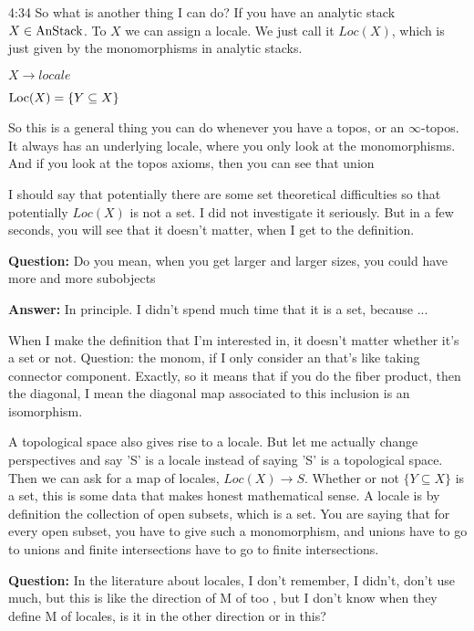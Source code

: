 \begin{unfinished}{4:34}
So what is another thing I can do? If you have an analytic stack $X \in \text{AnStack}$.
To $X$ we can assign a locale. We just call it $Loc(X)$, which is just given by the monomorphisms in analytic stacks.

$ X \rightarrow locale$

$ \text{Loc}(X) = \{ Y \subseteq X \} $

So this is a general thing you can do whenever you have a topos, or an $\infty$-topos.
It always has an underlying locale, where you only look at the monomorphisms. And if you look at the topos axioms, then you can see that union 

I should say that potentially there are some set theoretical difficulties so that potentially $Loc(X)$ is not a set. I did not investigate it seriously. But in a few seconds, you will see that it doesn't matter, when I get to the definition.

\textbf{Question:} Do you mean, when you get larger and larger sizes, you could have more and more subobjects

\textbf{Answer:} In principle. I didn't spend much time that it is a set, because ...


When I make the definition that I'm interested in, it doesn't matter whether it's a set or not. Question: the monom, if I only consider an that's like taking connector component. Exactly, so it means that if you do the fiber product, then the diagonal, I mean the diagonal map associated to this inclusion is an isomorphism.

A topological space also gives rise to a locale. But let me actually change perspectives and say 'S' is a locale instead of saying 'S' is a topological space. 
Then we can ask for a map of locales, $Loc(X) \rightarrow S$. Whether or not $\{ Y \subseteq X \} $ is a set, this is some data that makes honest mathematical sense. A locale is by definition the collection of open subsets, which is a set. You are saying that for every open subset, you have to give such a monomorphism, and  unions have to go to unions and finite intersections have to go to finite intersections.

\textbf{Question:} In the literature about locales, I don't remember, I didn't, don't use much, but this is like the direction of M of too \citeme{}, but I don't know when they define M of locales, is it in the other direction or in this? 


\end{unfinished}
